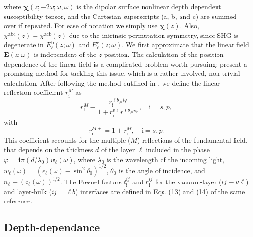 \documentclass[utf8]{frontiersSCNS}
\begin{document}
where $\boldsymbol{\chi}(z;-2\omega;\omega,\omega)$ is the dipolar surface
nonlinear depth dependent susceptibility tensor, and the Cartesian superscripts
(a, b, and c) are summed over if repeated. For ease of notation we simply use
$\boldsymbol{\chi}(z)$. Also, $\chi^{\mathrm{abc}}(z) = \chi^{\mathrm{acb}}(z)$
due to the intrinsic permutation symmetry, since SHG is degenerate in
$E^{\mathrm{b}}_{\ell}(z;\omega)$ and $E^{\mathrm{c}}_{\ell}(z;\omega)$. We
first approximate that the linear field $\mathbf{E}(z;\omega)$ is independent of
the $z$ position. 
{\color{red}
The calculation of the position dependence of the linear field is a complicated
problem worth pursuing; \cite{nicolasPRB15} present a promising method for tackling this issue, which is a rather involved, non-trivial calculation.
}
After following the method outlined in \cite{andersonPRB16b}, we define the
linear reflection coefficient $r^{M}_{\mathrm{i}}$ as
\begin{equation}\label{mvrm}
r^{M}_{\mathrm{i}} \equiv 
\frac{r^{\ell b}_{\mathrm{i}}e^{i\varphi}}{1+r^{v\ell}_{\mathrm{i}}
r^{\ell b}_{\mathrm{i}}e^{i\varphi}}, \quad \mathrm{i}=s,p,
\end{equation}
with
\begin{equation}\label{eq:mvc}
r^{M\pm}_{\mathrm{i}} = 1\pm r^{M}_{\mathrm{i}},\quad \mathrm{i} = s,p.
\end{equation}
This coefficient accounts for the multiple ($M$) reflections of the fundamental
field, that depends on the thickness $d$ of the layer $\ell$ included in the
phase $\varphi = 4\pi(d/\lambda_{0})w_{\ell}(\omega)$, where $\lambda_{0}$ is
the wavelength of the incoming light, $w_{\ell}(\omega) =
(\epsilon_{\ell}(\omega) - \sin^{2}\theta_{0})^{1/2}$, $\theta_{0}$ is the angle
of incidence, and $n_{\ell} = (\epsilon_{\ell}(\omega))^{1/2}$. The Fresnel
factors $t^{ij}_{\mathrm{i}}$ and $r^{ij}_{\mathrm{i}}$ for the vacuum-layer
($ij = v\ell$) and layer-bulk ($ij = \ell b$) interfaces are defined in Eqs.
(13) and (14) of the same reference.



\subsection{Depth-dependance}
\end{document}
